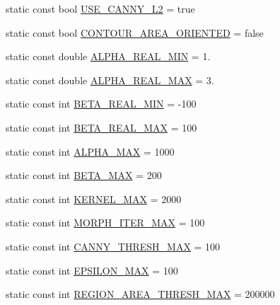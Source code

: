 \begin{DoxyCompactItemize}
static const bool \hyperlink{classmultiscale_1_1analysis_1_1RegionDetector_a6a8c4f7b9a6bc40ec6de940f53943772}{\-U\-S\-E\-\_\-\-C\-A\-N\-N\-Y\-\_\-\-L2} = true
\item 
static const bool \hyperlink{classmultiscale_1_1analysis_1_1RegionDetector_ab1fdebf0daaae6f2bb1fe4770479116f}{\-C\-O\-N\-T\-O\-U\-R\-\_\-\-A\-R\-E\-A\-\_\-\-O\-R\-I\-E\-N\-T\-E\-D} = false
\item 
static const double \hyperlink{classmultiscale_1_1analysis_1_1RegionDetector_a4a11aa86a5250ca6197589c4ccb770f6}{\-A\-L\-P\-H\-A\-\_\-\-R\-E\-A\-L\-\_\-\-M\-I\-N} = 1.
\item 
static const double \hyperlink{classmultiscale_1_1analysis_1_1RegionDetector_abc853d2cfef9e4fafbf86715b48495e0}{\-A\-L\-P\-H\-A\-\_\-\-R\-E\-A\-L\-\_\-\-M\-A\-X} = 3.
\item 
static const int \hyperlink{classmultiscale_1_1analysis_1_1RegionDetector_a87d07b8a993b50bcf050e4c206ac126c}{\-B\-E\-T\-A\-\_\-\-R\-E\-A\-L\-\_\-\-M\-I\-N} = -\/100
\item 
static const int \hyperlink{classmultiscale_1_1analysis_1_1RegionDetector_a19e9e6c3ea18fe9a3dbf7a1a02652985}{\-B\-E\-T\-A\-\_\-\-R\-E\-A\-L\-\_\-\-M\-A\-X} = 100
\item 
static const int \hyperlink{classmultiscale_1_1analysis_1_1RegionDetector_a7ca1e136dc9d768f1e11cd6f770d950f}{\-A\-L\-P\-H\-A\-\_\-\-M\-A\-X} = 1000
\item 
static const int \hyperlink{classmultiscale_1_1analysis_1_1RegionDetector_ad2c6485f637cae5abee0303b41df1480}{\-B\-E\-T\-A\-\_\-\-M\-A\-X} = 200
\item 
static const int \hyperlink{classmultiscale_1_1analysis_1_1RegionDetector_aa988e3458f774c489e03e3f8bd0db1ed}{\-K\-E\-R\-N\-E\-L\-\_\-\-M\-A\-X} = 2000
\item 
static const int \hyperlink{classmultiscale_1_1analysis_1_1RegionDetector_adeaa40a86b09bad2530bf179cbb4e602}{\-M\-O\-R\-P\-H\-\_\-\-I\-T\-E\-R\-\_\-\-M\-A\-X} = 100
\item 
static const int \hyperlink{classmultiscale_1_1analysis_1_1RegionDetector_ad6590f4617a6b3d34c6032f8febd7beb}{\-C\-A\-N\-N\-Y\-\_\-\-T\-H\-R\-E\-S\-H\-\_\-\-M\-A\-X} = 100
\item 
static const int \hyperlink{classmultiscale_1_1analysis_1_1RegionDetector_a724d57c0db65696f2ddab415deb1138d}{\-E\-P\-S\-I\-L\-O\-N\-\_\-\-M\-A\-X} = 100
\item 
static const int \hyperlink{classmultiscale_1_1analysis_1_1RegionDetector_a8a301bd841d376448aff4a0c4d0a1485}{\-R\-E\-G\-I\-O\-N\-\_\-\-A\-R\-E\-A\-\_\-\-T\-H\-R\-E\-S\-H\-\_\-\-M\-A\-X} = 200000

\end{DoxyCompactItemize}
